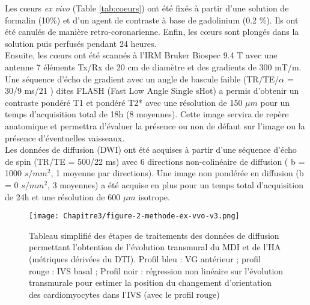 Les cœurs \textit{ex vivo} (Table \ref{tab:coeurs}) ont été fixés à partir d’une solution de formalin (10\%) et d’un agent de contraste à base de gadolinium (0.2 \%). Ils ont été canulés de manière retro-coronarienne. Enfin, les cœurs sont plongés dans la solution puis perfusés pendant 24 heures.
\\
Ensuite, les cœurs ont été scannés à l’IRM Bruker Biospec 9.4 T avec une antenne 7 éléments Tx/Rx de 20 cm de diamètre et des gradients de 300 mT/m.  
\\
Une séquence d’écho de gradient avec un angle de bascule faible (TR/TE/$\alpha$ = 30/9 ms/21 ) dites FLASH (Fast Low Angle Single sHot) a permis d’obtenir un contraste pondéré T1 et pondéré T2* avec une résolution de 150 $\mu m$ pour un temps d’acquisition total de 18h (8 moyennes). Cette image servira de repère anatomique et permettra d’évaluer la présence ou non de défaut sur l’image ou la présence d’éventuelles vaisseaux. 
\\
Les données de diffusion (DWI) ont été acquises à partir d’une séquence d’écho de spin (TR/TE = 500/22 ms) avec 6 directions non-colinéaire de diffusion ( b = 1000 $s/mm^2$, 1 moyenne par directions). Une image non pondérée en diffusion (b = 0 $s/mm^2$, 3 moyennes) a été acquise en plus pour un temps total d'acquisition de 24h et une résolution de 600 $\mu m$ isotrope.

\begin{figure}[!ht]
  \begin{center}
    \texttt{[image: Chapitre3/figure-2-methode-ex-vvo-v3.png]}
  \end{center}
  \caption{Tableau simplifié des étapes de traitements des données de diffusion permettant l’obtention de l’évolution transmural du MDI et de l’HA (métriques dérivées du DTI). Profil bleu : VG antérieur ; profil rouge : IVS basal ; Profil noir : régression non linéaire sur l’évolution transmurale pour estimer la position du changement d’orientation des cardiomyocytes dans l’IVS (avec le profil rouge)}
  \label{fig:pipeline}
\end{figure}

